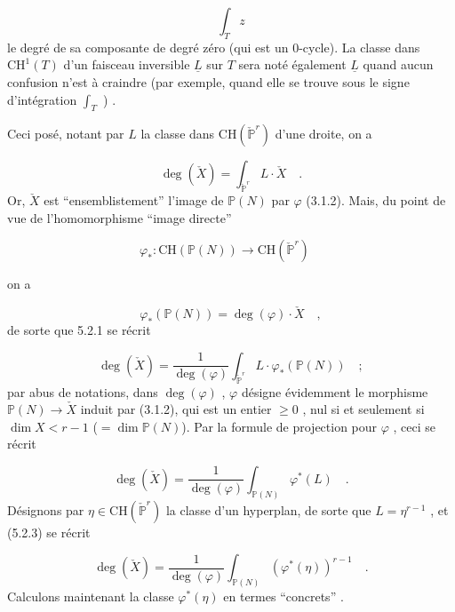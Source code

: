 \begin{equation*}
\int_T z
\end{equation*}
le degré de sa composante de degré zéro (qui est un $0$-cycle). La classe dans $\mathrm{CH}^1(T)$ d'un faisceau inversible $\underline{L}$ sur $T$ sera noté également $\underline{L}$ quand aucun confusion n'est à craindre (par exemple, quand elle se trouve sous le signe d'intégration $\int_T$ ) .

Ceci posé, notant par $L$ la classe dans $\mathrm{CH}(\check{\mathbb{P}}^r)$ d'une droite, on a

\begin{equation}\tag{5.2.1}
\deg(\check{X}) = \int_{\check{\mathbb{P}}^r} L\cdot\check{X} \quad .
\end{equation}
Or, $\check{X}$ est ``ensemblistement'' l'image de $\mathbb{P}(N)$ par $\varphi$ (3.1.2). Mais, du point de vue de l'homomorphisme ``image directe''

\begin{equation*}
\varphi_* : \mathrm{CH}(\mathbb{P}(N)) \longrightarrow \mathrm{CH}(\check{\mathbb{P}}^r) \quad 
\end{equation*}


 on a

\begin{equation*}
\varphi_*( \mathbb{P}(N)) = \deg(\varphi)\cdot \check{X} \quad ,
\end{equation*}
de sorte que 5.2.1 se récrit

\begin{equation}\tag{5.2.2}
\deg(\check{X}) = \frac{1}{\deg(\varphi)} \int_{\check{\mathbb{P}}^r} L\cdot\varphi_*( \mathbb{P}(N)) \quad ;
\end{equation}
par abus de notations, dans $\deg(\varphi)$ , $\varphi$ désigne évidemment le morphisme $\mathbb{P}(N) \longrightarrow \check{X}$ induit par (3.1.2), qui est un entier $\geqslant 0$ , nul si et seulement si $\dim X < r-1$ ($=\dim \mathbb{P}(N)$). Par la formule de projection pour $\varphi$ , ceci se récrit

\begin{equation}\tag{5.2.3}
\deg(\check{X}) = \frac{1}{\deg(\varphi)} \int_{\mathbb{P}(N)} \varphi^*(L) \quad .
\end{equation}
Désignons par $\eta \in \mathrm{CH}( \check{\mathbb{P}}^r)$ la classe d'un hyperplan, de sorte que $L = \eta^{r-1}$ , et (5.2.3) se récrit

\begin{equation}\tag{5.2.4}
\deg(\check{X}) = \frac{1}{\deg(\varphi)} \int_{\mathbb{P}(N)} (\varphi^*(\eta))^{r-1} \quad .
\end{equation}
Calculons maintenant la classe $\varphi^*(\eta)$ en termes ``concrets'' .

